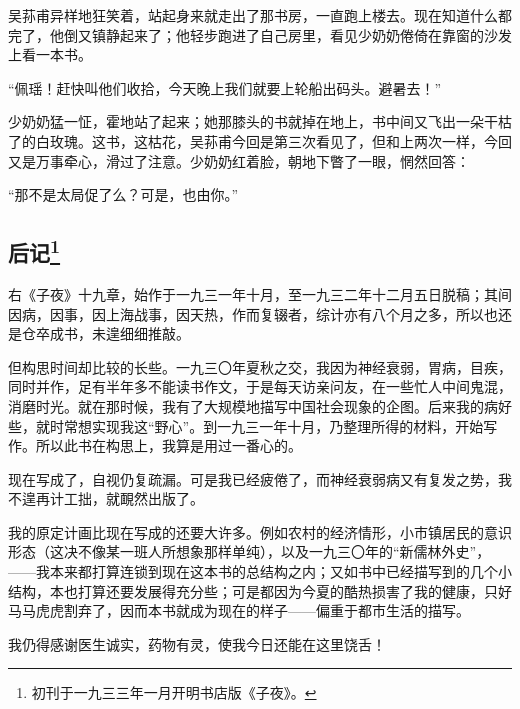 \par 吴荪甫异样地狂笑着，站起身来就走出了那书房，一直跑上楼去。现在知道什么都完了，他倒又镇静起来了；他轻步跑进了自己房里，看见少奶奶倦倚在靠窗的沙发上看一本书。
\par “佩瑶！赶快叫他们收拾，今天晚上我们就要上轮船出码头。避暑去！”
\par 少奶奶猛一怔，霍地站了起来；她那膝头的书就掉在地上，书中间又飞出一朵干枯了的白玫瑰。这书，这枯花，吴荪甫今回是第三次看见了，但和上两次一样，今回又是万事牵心，滑过了注意。少奶奶红着脸，朝地下瞥了一眼，惘然回答：
\par “那不是太局促了么？可是，也由你。”



\subsection*{后记\footnote{初刊于一九三三年一月开明书店版《子夜》。}}
\par 右《子夜》十九章，始作于一九三一年十月，至一九三二年十二月五日脱稿；其间因病，因事，因上海战事，因天热，作而复辍者，综计亦有八个月之多，所以也还是仓卒成书，未遑细细推敲。
\par 但构思时间却比较的长些。一九三〇年夏秋之交，我因为神经衰弱，胃病，目疾，同时并作，足有半年多不能读书作文，于是每天访亲问友，在一些忙人中间鬼混，消磨时光。就在那时候，我有了大规模地描写中国社会现象的企图。后来我的病好些，就时常想实现我这“野心”。到一九三一年十月，乃整理所得的材料，开始写作。所以此书在构思上，我算是用过一番心的。
\par 现在写成了，自视仍复疏漏。可是我已经疲倦了，而神经衰弱病又有复发之势，我不遑再计工拙，就靦然出版了。
\par 我的原定计画比现在写成的还要大许多。例如农村的经济情形，小市镇居民的意识形态（这决不像某一班人所想象那样单纯），以及一九三〇年的“新儒林外史”，——我本来都打算连锁到现在这本书的总结构之内；又如书中已经描写到的几个小结构，本也打算还要发展得充分些；可是都因为今夏的酷热损害了我的健康，只好马马虎虎割弃了，因而本书就成为现在的样子——偏重于都市生活的描写。
\par 我仍得感谢医生诚实，药物有灵，使我今日还能在这里饶舌！
\par {}
\par {}


